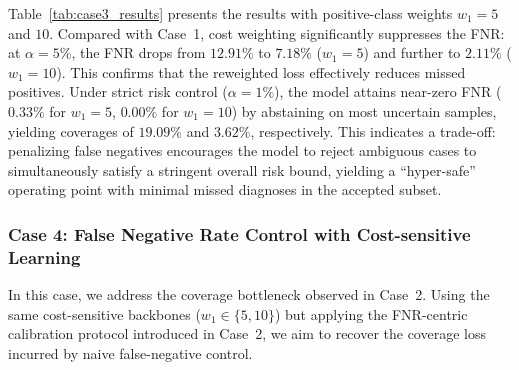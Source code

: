 \documentclass[journal,twoside,web]{ieeecolor}
\begin{document}
Table~\ref{tab:case3_results} presents the results with positive-class weights $w_1 = 5$ and $10$. Compared with Case~1, cost weighting significantly suppresses the FNR: at $\alpha=5\%$, the FNR drops from $12.91\%$ to $7.18\%$ ($w_1=5$) and further to $2.11\%$ ($w_1=10$). This confirms that the reweighted loss effectively reduces missed positives. Under strict risk control ($\alpha=1\%$), the model attains near-zero FNR ($0.33\%$ for $w_1=5$, $0.00\%$ for $w_1=10$) by abstaining on most uncertain samples, yielding coverages of $19.09\%$ and $3.62\%$, respectively. This indicates a trade-off: penalizing false negatives encourages the model to reject ambiguous cases to simultaneously satisfy a stringent overall risk bound, yielding a “hyper-safe” operating point with minimal missed diagnoses in the accepted subset.



\subsubsection{\textbf{Case 4: False Negative Rate Control with Cost-sensitive Learning}}
\label{sec:case4_results}

In this case, we address the coverage bottleneck observed in Case~2. Using the same cost-sensitive backbones ($w_{1} \in \{5, 10\}$) but applying the FNR-centric calibration protocol introduced in Case~2, we aim to recover the coverage loss incurred by naive false-negative control.

\begin{table}[htbp]
    \centering
    \caption{The selective classification performance of Case 4 ($w_{1}=5$ and $w_{1}=10$).}
    \label{tab:case4_results}
\end{table}
\end{document}
